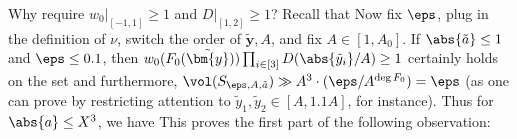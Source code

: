 \documentclass[12pt]{report}
\begin{document}
Why require $w_0\vert_{[-1,1]}\geq 1$ and $D\vert_{[1,2]}\geq 1$?
Recall that
Now fix $\eps$,
plug in the definition of $\nu$,
switch the order of $\tilde{\bm{y}},A$,
and fix $A\in[1,A_0]$.
If $\abs{\tilde{a}}\leq 1$ and $\eps\leq 0.1$,
then $w_0(F_0(\tilde{\bm{y}}))
\prod_{i\in[3]}D(\abs{\tilde{y}_i}/A)
\geq 1$ certainly holds on the set
and furthermore,
$\vol(S_{\eps,A,\tilde{a}})
\gg A^3\cdot(\eps/A^{\deg{F_0}})
= \eps$
(as one can prove by
restricting attention to $\tilde{y}_1,\tilde{y}_2\in[A,1.1A]$,
for instance).
Thus for $\abs{a}\leq X^3$,
we have
This proves the first part of the following observation:
\end{document}
